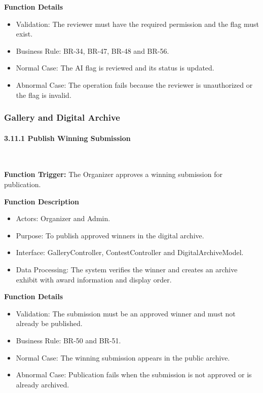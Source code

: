 \textbf{Function Details}
\begin{itemize}[leftmargin=1.5em, nosep]
    \item Validation: The reviewer must have the required permission and the flag must exist.
    \item Business Rule: BR-34, BR-47, BR-48 and BR-56.
    \item Normal Case: The AI flag is reviewed and its status is updated.
    \item Abnormal Case: The operation fails because the reviewer is unauthorized or the flag is invalid.
\end{itemize}

\subsubsection{Gallery and Digital Archive}
\label{subsubsec:gallery-digital-archive}

\paragraph*{3.11.1 Publish Winning Submission}\leavevmode\\[-0.5em]
\label{par:publish-winning-submission}

\textbf{Function Trigger:} The Organizer approves a winning submission for publication.

\textbf{Function Description}
\begin{itemize}[leftmargin=1.5em, nosep]
    \item Actors: Organizer and Admin.
    \item Purpose: To publish approved winners in the digital archive.
    \item Interface: GalleryController, ContestController and DigitalArchiveModel.
    \item Data Processing: The system verifies the winner and creates an archive exhibit with award information and display order.
\end{itemize}

\textbf{Function Details}
\begin{itemize}[leftmargin=1.5em, nosep]
    \item Validation: The submission must be an approved winner and must not already be published.
    \item Business Rule: BR-50 and BR-51.
    \item Normal Case: The winning submission appears in the public archive.
    \item Abnormal Case: Publication fails when the submission is not approved or is already archived.
\end{itemize}

